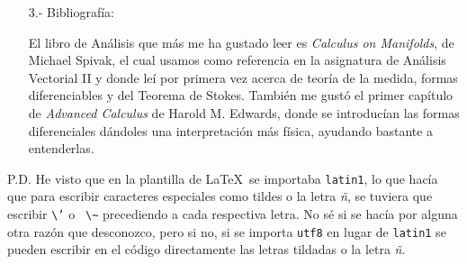 \documentclass[a4paper,oneside,11pt,leqno]{article}
\newtheorem{theorem}{Teorema}
\begin{document}
\begin{enumerate}
Podría decir que mi resultado favorito (aunque supongo que es poco original) en Análisis es el Teorema de Stokes:
\begin{theorem}
    Si $ M $ es una variedad k-dimensional orientada compacta con frontera y $ \omega $ es una (k-1)-forma en $ M $, entonces
    $$
        \int_{M} d \omega = \int_{\partial M} \omega.
    $$
\end{theorem}
La principal razón por la que me gusta es que tras llegar a él, enunciamos varios teoremas en clase como el Teorema de Green o el Teorema de la divergencia, los cuales al parecer eran muy importantes (pese a que yo nunca había oído hablar de ellos) y quedaban relegados a casos particulares del Teorema de Stokes, siendo ese momento uno de los primeros momentos en los que vi lo bonito que es el poder de generalización de las Matemáticas.

\item[3.-] { Bibliografía}:

El libro de Análisis que más me ha gustado leer es \textit{Calculus on Manifolds}, de Michael Spivak, el cual usamos como referencia en la asignatura de Análisis Vectorial II y donde leí por primera vez acerca de teoría de la medida, formas diferenciables y del Teorema de Stokes. También me gustó el primer capítulo de \textit{Advanced Calculus} de Harold M. Edwards, donde se introducían las formas diferenciales dándoles una interpretación más física, ayudando bastante a entenderlas.

\end{enumerate}

P.D. He visto que en la plantilla de \LaTeX \ se importaba \texttt{latin1}, lo que hacía que para escribir caracteres especiales como tildes o la letra \textit{ñ}, se tuviera que escribir \texttt{\textbackslash{}'} o \texttt{ \textbackslash{}\~} precediendo a cada respectiva letra. No sé si se hacía por alguna otra razón que desconozco, pero si no, si se importa \texttt{utf8} en lugar de \texttt{latin1} se pueden escribir en el código directamente las letras tildadas o la letra \textit{ñ}.
\end{document}
